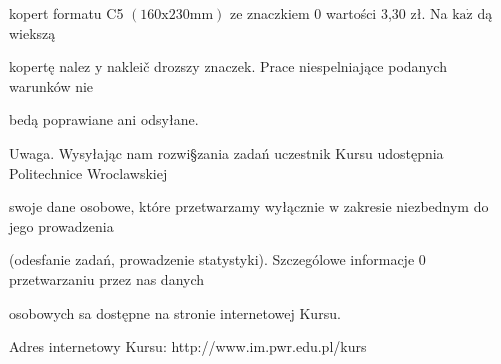 \documentclass[a4paper,12pt]{article}
\begin{document}
kopert formatu C5 $(160\mathrm{x}230\mathrm{m}\mathrm{m})$ ze znaczkiem $0$ wartości 3,30 zł. Na $\mathrm{k}\mathrm{a}\dot{\mathrm{z}}$ dą wiekszą

kopertę nalez $\mathrm{y}$ nakleič drozszy znaczek. Prace niespelniające podanych warunków nie

bedą poprawiane ani odsyłane.

Uwaga. Wysyłając nam rozwi\S zania zadań uczestnik Kursu udostępnia Politechnice Wroclawskiej

swoje dane osobowe, które przetwarzamy wyłącznie $\mathrm{w}$ zakresie niezbednym do jego prowadzenia

(odesfanie zadań, prowadzenie statystyki). Szczególowe informacje $0$ przetwarzaniu przez nas danych

osobowych sa dostępne na stronie internetowej Kursu.

Adres internetowy Kursu: http://www.im.pwr.edu.pl/kurs
\end{document}
